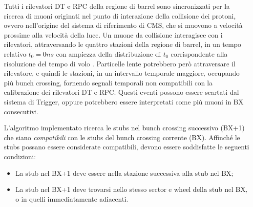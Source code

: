 Tutti i rilevatori DT e RPC della regione di barrel sono sincronizzati per la ricerca di muoni originati nel punto di interazione della collisione dei protoni, ovvero nell'origine del sistema di riferimento di CMS, che si muovono a velocità prossime alla velocità della luce. Un muone da collisione interagisce con i rilevatori, attraversando le quattro stazioni della regione di barrel, in un tempo relativo $t_0 = 0 \si{ns}$ con ampiezza della distribuzione di $t_0$ corrispondente alla risoluzione del tempo di volo \cite{MasterThesisGioMoc}. Particelle lente  potrebbero però attraversare il rilevatore, e quindi le stazioni, in un intervallo temporale maggiore, occupando più bunch crossing, fornendo segnali temporali non compatibili con la calibrazione dei rilevatori DT e RPC. Questi eventi possono essere scartati dal sistema di Trigger, oppure potrebbero essere interpretati come più muoni in BX consecutivi.


\begin{figure}[t]
  \centering
  \centering
  \caption{}
  \label{fig:CMSLayout}
\end{figure}


L'algoritmo implementato ricerca le stubs nel bunch crossing successivo (BX+1) che siano \textit{compatibili} con le stubs del bunch crossing corrente (BX). Affinché le stubs possano essere considerate compatibili, devono essere soddisfatte le seguenti condizioni:

\begin{itemize}
  \item La stub nel BX+1 deve essere nella stazione successiva alla stub nel BX;
  \item La stub nel BX+1 deve trovarsi nello stesso sector e wheel della stub nel BX, o in quelli immediatamente adiacenti.
\end{itemize}



